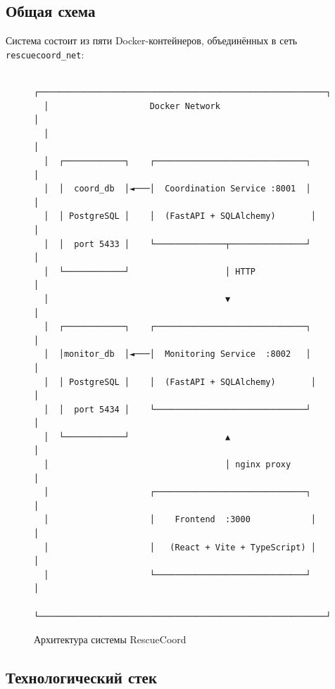\documentclass[12pt,a4paper]{article}
\begin{document}
\subsection{Общая схема}

Система состоит из пяти Docker-контейнеров, объединённых в сеть
\texttt{rescuecoord\_net}:

\begin{figure}[H]
\centering
\begin{Verbatim}
  ┌─────────────────────────────────────────────────────────┐
  │                    Docker Network                        │
  │                                                          │
  │  ┌────────────┐    ┌──────────────────────────────┐     │
  │  │  coord_db  │◄───│  Coordination Service :8001  │     │
  │  │ PostgreSQL │    │  (FastAPI + SQLAlchemy)       │     │
  │  │  port 5433 │    └──────────────┬───────────────┘     │
  │  └────────────┘                   │ HTTP                 │
  │                                   ▼                      │
  │  ┌────────────┐    ┌──────────────────────────────┐     │
  │  │monitor_db  │◄───│  Monitoring Service  :8002   │     │
  │  │ PostgreSQL │    │  (FastAPI + SQLAlchemy)       │     │
  │  │  port 5434 │    └──────────────────────────────┘     │
  │  └────────────┘                   ▲                      │
  │                                   │ nginx proxy          │
  │                    ┌──────────────────────────────┐     │
  │                    │    Frontend  :3000            │     │
  │                    │   (React + Vite + TypeScript) │     │
  │                    └──────────────────────────────┘     │
  └─────────────────────────────────────────────────────────┘
\end{Verbatim}
\caption{Архитектура системы RescueCoord}
\end{figure}

\subsection{Технологический стек}
\end{document}
